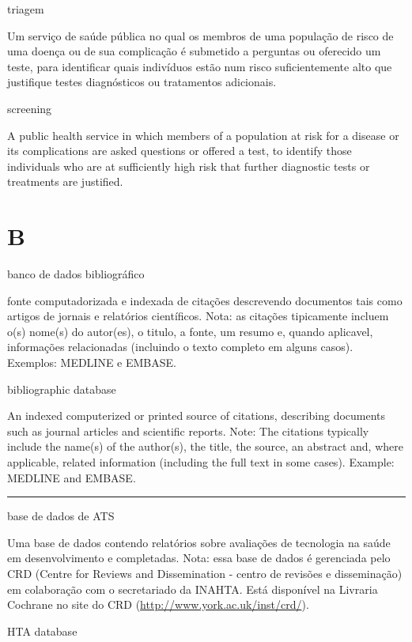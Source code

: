 \documentclass[
]{book}
\begin{document}
triagem

Um serviço de saúde pública no qual os membros de uma população de risco de uma doença ou de sua complicação é submetido a perguntas ou oferecido um teste, para identificar quais indivíduos estão num risco suficientemente alto que justifique testes diagnósticos ou tratamentos adicionais.

screening

A public health service in which members of a population at risk for a disease or its complications are asked questions or offered a test, to identify those individuals who are at sufficiently high risk that further diagnostic tests or treatments are justified.

\hypertarget{b-1}{%
\chapter*{B}\label{b-1}}

banco de dados bibliográfico

fonte computadorizada e indexada de citações descrevendo documentos tais como artigos de jornais e relatórios científicos. Nota: as citações tipicamente incluem o(s) nome(s) do autor(es), o titulo, a fonte, um resumo e, quando aplicavel, informações relacionadas (incluindo o texto completo em alguns casos). Exemplos: MEDLINE e EMBASE.

bibliographic database

An indexed computerized or printed source of citations, describing documents such as journal articles and scientific reports. Note: The citations typically include the name(s) of the author(s), the title, the source, an abstract and, where applicable, related information (including the full text in some cases). Example: MEDLINE and EMBASE.

\begin{center}\rule{0.5\linewidth}{0.5pt}\end{center}

base de dados de ATS

Uma base de dados contendo relatórios sobre avaliações de tecnologia na saúde em desenvolvimento e completadas. Nota: essa base de dados é gerenciada pelo CRD (Centre for Reviews and Dissemination - centro de revisões e disseminação) em colaboração com o secretariado da INAHTA. Está disponível na Livraria Cochrane no site do CRD (\url{http://www.york.ac.uk/inst/crd/}).

HTA database
\end{document}
